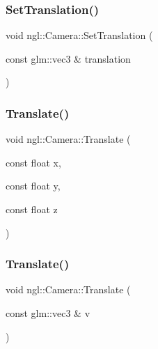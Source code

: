 \subsubsection{\texorpdfstring{Set\+Translation()}{SetTranslation()}}
{\footnotesize\ttfamily void ngl\+::\+Camera\+::\+Set\+Translation (\begin{DoxyParamCaption}\item[{const glm\+::vec3 \&}]{translation }\end{DoxyParamCaption})}

\mbox{\label{classngl_1_1_camera_a53bf8a2a394f34e55549219b24b34e10}} 
\subsubsection{\texorpdfstring{Translate()}{Translate()}\hspace{0.1cm}{\footnotesize\ttfamily [1/2]}}
{\footnotesize\ttfamily void ngl\+::\+Camera\+::\+Translate (\begin{DoxyParamCaption}\item[{const float}]{x,  }\item[{const float}]{y,  }\item[{const float}]{z }\end{DoxyParamCaption})}

\mbox{\label{classngl_1_1_camera_a228cffe138cb651b5fae04a09530a5f0}} 
\subsubsection{\texorpdfstring{Translate()}{Translate()}\hspace{0.1cm}{\footnotesize\ttfamily [2/2]}}
{\footnotesize\ttfamily void ngl\+::\+Camera\+::\+Translate (\begin{DoxyParamCaption}\item[{const glm\+::vec3 \&}]{v }\end{DoxyParamCaption})}

\mbox{\label{classngl_1_1_camera_a9c320643e3eb9ab10215d05ac9fc6681}} 
